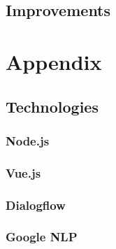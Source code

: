 \documentclass{article}
\begin{document}
\subsection{Improvements}

\newpage
\section{Appendix}

\subsection{Technologies}

\subsubsection{Node.js}

\subsubsection{Vue.js}

\subsubsection{Dialogflow}

\subsubsection{Google NLP}
\end{document}
